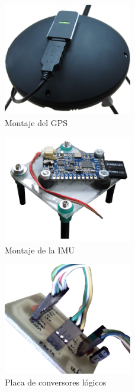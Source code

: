 \documentclass[main]{subfiles}
\begin{document}
\begin{figure}
	\begin{center}
		\includegraphics[width=0.5\textwidth]{./pics_montaje/gps.jpg}
	\end{center}
	\caption{Montaje del GPS}
	\label{fig:gps}
\end{figure}

\begin{figure}
	\begin{center}
		\includegraphics[width=0.5\textwidth]{./pics_montaje/imu.jpg}
	\end{center}
	\caption{Montaje de la IMU}
	\label{fig:imu}
\end{figure}

\begin{figure}
	\begin{center}
		\includegraphics[width=0.5\textwidth]{./pics_montaje/cl.jpg}
	\end{center}
	\caption{Placa de conversores lógicos}
	\label{fig:cl}
\end{figure}
\end{document}
